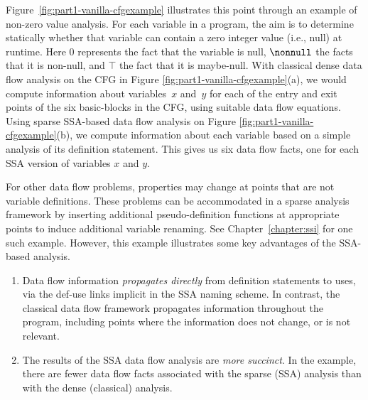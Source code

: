 Figure~\ref{fig:part1-vanilla-cfgexample} illustrates this point through an example of non-zero value analysis. For each variable in a program, the aim is to determine statically whether
that variable can contain a zero integer value (i.e., null) at runtime. Here $0$ represents the fact that the variable is null, $\nonnull$  the facts that it is non-null, and $\top$ the fact that it is maybe-null. 
With classical dense data flow analysis on the CFG in Figure
\ref{fig:part1-vanilla-cfgexample}(a),
we would compute information about variables~$x$ and~$y$ for each of 
the entry and exit points of the six basic-blocks
in the CFG, using suitable data flow equations.
Using sparse SSA-based data flow analysis on Figure 
\ref{fig:part1-vanilla-cfgexample}(b),
we compute information about each variable based on a simple
analysis of its definition statement. This gives us six data flow facts,
one for each SSA version of variables $x$ and $y$.

For other data flow problems, properties may 
change at points that are not variable definitions.
These problems can be accommodated in a sparse analysis framework
by inserting additional pseudo-definition functions at appropriate 
points
to induce additional variable renaming. 
See Chapter~\ref{chapter:ssi}
for one such example.
%
However, this example illustrates some key advantages of the SSA-based analysis.
\begin{enumerate}
\item Data flow information
\textit{propagates directly}
from definition statements to uses, via
the def-use links implicit in the SSA naming scheme. 
In contrast, the 
classical data flow framework 
propagates information throughout the program,
including points where the information 
does not change, or is not relevant.
\item The results of the SSA data flow analysis are
\textit{more succinct}.
In the example, there are fewer data flow facts associated with
the sparse (SSA) analysis than with the dense (classical) analysis.
\end{enumerate}

